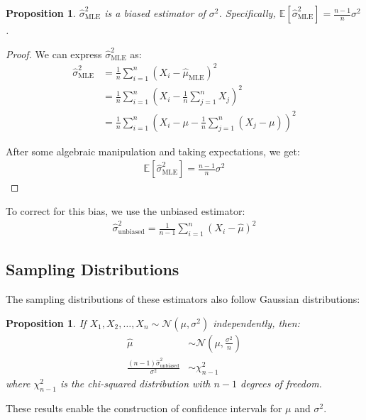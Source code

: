 \documentclass{article}
\newtheorem{proposition}[theorem]{Proposition}
\begin{document}
\begin{proposition}
$\hat{\sigma}^2_{\text{MLE}}$ is a biased estimator of $\sigma^2$. Specifically, $\mathbb{E}[\hat{\sigma}^2_{\text{MLE}}] = \frac{n-1}{n} \sigma^2$.
\end{proposition}

\begin{proof}
We can express $\hat{\sigma}^2_{\text{MLE}}$ as:
\begin{align*}
\hat{\sigma}^2_{\text{MLE}} &= \frac{1}{n} \sum_{i=1}^n (X_i - \hat{\mu}_{\text{MLE}})^2 \\
&= \frac{1}{n} \sum_{i=1}^n \left(X_i - \frac{1}{n} \sum_{j=1}^n X_j\right)^2 \\
&= \frac{1}{n} \sum_{i=1}^n \left(X_i - \mu - \frac{1}{n} \sum_{j=1}^n (X_j - \mu)\right)^2
\end{align*}

After some algebraic manipulation and taking expectations, we get:
\begin{align*}
\mathbb{E}[\hat{\sigma}^2_{\text{MLE}}] = \frac{n-1}{n} \sigma^2
\end{align*}
\end{proof}

To correct for this bias, we use the unbiased estimator:
\begin{align*}
\hat{\sigma}^2_{\text{unbiased}} = \frac{1}{n-1} \sum_{i=1}^n (X_i - \hat{\mu})^2
\end{align*}

\subsection{Sampling Distributions}

The sampling distributions of these estimators also follow Gaussian distributions:

\begin{proposition}
If $X_1, X_2, \ldots, X_n \sim \mathcal{N}(\mu, \sigma^2)$ independently, then:
\begin{align*}
\hat{\mu} &\sim \mathcal{N}\left(\mu, \frac{\sigma^2}{n}\right) \\
\frac{(n-1)\hat{\sigma}^2_{\text{unbiased}}}{\sigma^2} &\sim \chi^2_{n-1}
\end{align*}
where $\chi^2_{n-1}$ is the chi-squared distribution with $n-1$ degrees of freedom.
\end{proposition}

These results enable the construction of confidence intervals for $\mu$ and $\sigma^2$.
\end{document}
